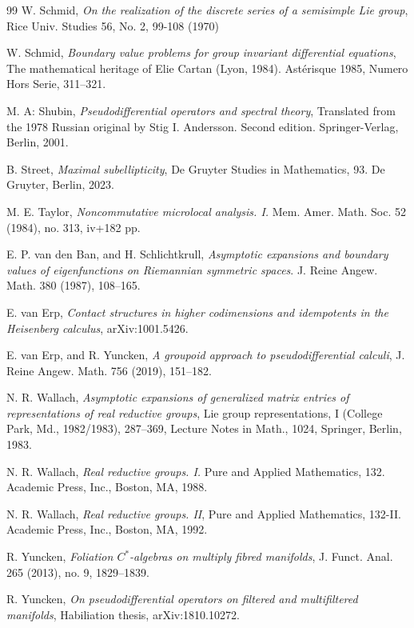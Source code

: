 \documentclass[a4paper,reqno]{amsart}
\numberwithin{equation}{section}
\theoremstyle{definition}
\theoremstyle{remark}
\begin{document}
\begin{thebibliography}{99}
 W. Schmid, \emph{On the realization of the discrete series of a semisimple Lie group}, Rice Univ. Studies 56, No. 2, 99-108 (1970)

 W. Schmid, \emph{Boundary value problems for group invariant diﬀerential equations}, The mathematical heritage of
Elie Cartan (Lyon, 1984). Astérisque 1985, Numero Hors Serie, 311--321.

 M. A: Shubin, \emph{Pseudodifferential operators and spectral theory}, Translated from the 1978 Russian original by Stig I. Andersson. Second edition. Springer-Verlag, Berlin, 2001.

 B. Street, \emph{Maximal subellipticity}, De Gruyter Studies in Mathematics, 93. De Gruyter, Berlin, 2023.

 M. E. Taylor, \emph{Noncommutative microlocal analysis. I.} Mem. Amer. Math. Soc. 52 (1984), no. 313, iv+182 pp.


 E. P. van den Ban,  and H. Schlichtkrull, \emph{Asymptotic expansions and boundary values of eigenfunctions on Riemannian symmetric spaces}. J. Reine Angew. Math. 380 (1987), 108--165.

 E. van Erp, \emph{Contact structures in higher codimensions and idempotents in the Heisenberg calculus}, arXiv:1001.5426.

 E. van Erp, and R. Yuncken, \emph{A groupoid approach to pseudodifferential calculi}, J. Reine Angew. Math. 756 (2019), 151--182. 

 N. R. Wallach, \emph{Asymptotic expansions of generalized matrix entries of representations of real reductive groups}, Lie group representations, I (College Park, Md., 1982/1983), 287--369, Lecture Notes in Math., 1024, Springer, Berlin, 1983.

 N. R. Wallach, \emph{Real reductive groups. I.} Pure and Applied Mathematics, 132. Academic Press, Inc., Boston, MA, 1988. 

 N. R. Wallach, \emph{Real reductive groups. II}, Pure and Applied Mathematics, 132-II. Academic Press, Inc., Boston, MA, 1992.

 R. Yuncken, \emph{Foliation $C^*$-algebras on multiply fibred manifolds}, J. Funct. Anal. 265 (2013), no. 9, 1829--1839.

 R. Yuncken, \emph{On pseudodifferential operators on filtered and multifiltered manifolds}, Habiliation thesis, arXiv:1810.10272.



\end{thebibliography}
\end{document}
